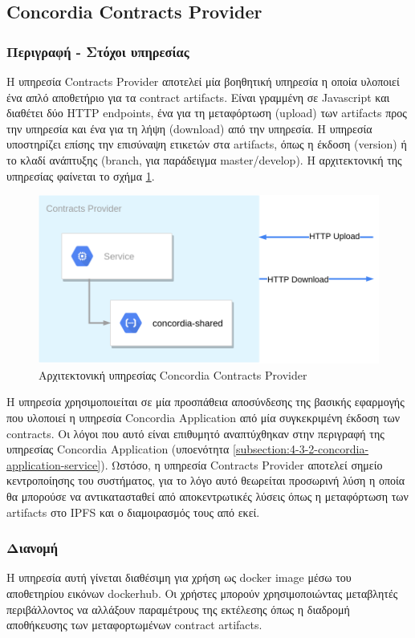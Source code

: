 \subsection{Concordia Contracts Provider} \label{subsection:4-3-5-concordia-contracts-provider-service}

\subsubsection{Περιγραφή - Στόχοι υπηρεσίας}

Η υπηρεσία Contracts Provider αποτελεί μία βοηθητική υπηρεσία η οποία υλοποιεί ένα απλό αποθετήριο για τα contract artifacts. Είναι γραμμένη σε Javascript και διαθέτει δύο HTTP \textenglish{endpoints}, ένα για τη μεταφόρτωση (upload) των artifacts προς την υπηρεσία και ένα για τη λήψη (download) από την υπηρεσία. Η υπηρεσία υποστηρίζει επίσης την επισύναψη ετικετών στα artifacts, όπως η έκδοση (version) ή το κλαδί ανάπτυξης (branch, για παράδειγμα \textenglish{master/develop}). Η αρχιτεκτονική της υπηρεσίας φαίνεται το σχήμα \ref{figure:4-3-concordia-contracts-provider-architecture}.

\begin{figure}[H]
    \centering
    \includegraphics[width=.6\textwidth]{assets/figures/chapter-4/4.3.architecture-4.3.5.concordia-contracts-provider-architecture}
    \caption{Αρχιτεκτονική υπηρεσίας Concordia Contracts Provider}
    \label{figure:4-3-concordia-contracts-provider-architecture}
\end{figure}

Η υπηρεσία χρησιμοποιείται σε μία προσπάθεια αποσύνδεσης της βασικής εφαρμογής που υλοποιεί η υπηρεσία Concordia Application από μία συγκεκριμένη έκδοση των contracts. Οι λόγοι που αυτό είναι επιθυμητό αναπτύχθηκαν στην περιγραφή της υπηρεσίας Concordia \textenglish{Application} (υποενότητα \ref{subsection:4-3-2-concordia-application-service}). Ωστόσο, η υπηρεσία Contracts Provider αποτελεί σημείο κεντροποίησης του συστήματος, για το λόγο αυτό θεωρείται προσωρινή λύση η οποία θα μπορούσε να αντικατασταθεί από αποκεντρωτικές λύσεις όπως η μεταφόρτωση των artifacts στο IPFS και ο διαμοιρασμός τους από εκεί.

\subsubsection{Διανομή}

Η υπηρεσία αυτή γίνεται διαθέσιμη για χρήση ως docker image μέσω του αποθετηρίου εικόνων dockerhub. Οι χρήστες μπορούν χρησιμοποιώντας μεταβλητές περιβάλλοντος να αλλάξουν παραμέτρους της εκτέλεσης όπως η διαδρομή αποθήκευσης των μεταφορτωμένων contract artifacts.